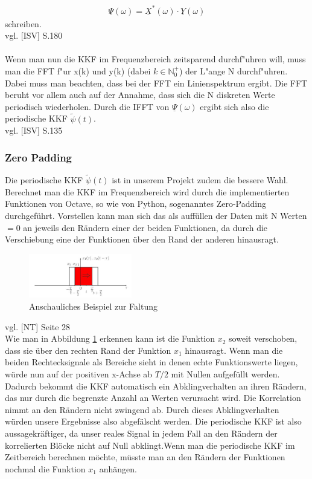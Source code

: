 \begin{align}
\boxed{\underline \Psi(\omega) = \underline{X}^*(\omega) \cdot \underline{Y}(\omega)}
\end{align}
schreiben.
\\vgl. [ISV] S.180
\\\\
Wenn man nun die KKF im Frequenzbereich zeitsparend durchf"uhren will, muss man die FFT f"ur x(k) und y(k) (dabei $k \in \mathbb{N}^+_0$) der L"ange N durchf"uhren. Dabei muss man beachten, dass bei der FFT ein Linienspektrum ergibt. Die FFT beruht vor allem auch auf der Annahme, dass sich die N diskreten Werte periodisch wiederholen. Durch die IFFT von $ \underline \Psi(\omega)$ ergibt sich also die periodische KKF $\tilde{\psi}(t)$.\\vgl. [ISV] S.135
\subsubsection{Zero Padding}
Die periodische KKF $\tilde{\psi}(t)$ ist in unserem Projekt zudem die bessere Wahl. Berechnet man die KKF im Frequenzbereich wird durch die implementierten Funktionen von Octave, so wie von Python, sogenanntes Zero-Padding durchgeführt. Vorstellen kann man sich das als auffüllen der Daten mit N Werten $=0$ an jeweils den Rändern einer der beiden Funktionen, da durch die Verschiebung eine der Funktionen über den Rand der anderen hinausragt.

\begin{figure}[ht!] 
  \centering
     \includegraphics[width=0.4\textwidth]{Faltung}
  \caption{Anschauliches Beispiel zur Faltung}
  \label{fig:Bild1}
\end{figure}
vgl. [NT] Seite 28\\
Wie man in Abbildung \ref{fig:Bild1} erkennen kann ist die Funktion $x_2$ soweit verschoben, dass sie über den rechten Rand der Funktion $x_1$ hinausragt. Wenn man die beiden Rechtecksignale als Bereiche sieht in denen echte Funktionswerte liegen, würde nun auf der positiven x-Achse ab $T/2$ mit Nullen aufgefüllt werden. Dadurch bekommt die KKF automatisch ein Abklingverhalten an ihren Rändern, das nur durch die begrenzte Anzahl an Werten verursacht wird. Die Korrelation nimmt an den Rändern nicht zwingend ab. Durch dieses Abklingverhalten würden unsere Ergebnisse also abgefälscht werden. Die periodische KKF ist also aussagekräftiger, da unser reales Signal in jedem Fall an den Rändern der korrelierten Blöcke nicht auf Null abklingt.Wenn man die periodische KKF im Zeitbereich berechnen möchte, müsste man an den Rändern der Funktionen nochmal die Funktion $x_1$ anhängen.
